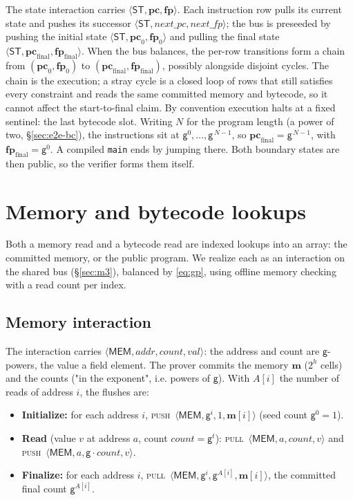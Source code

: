 \documentclass[11pt]{article}
\newcommand{\gen}{\mathsf{g}}
\newcommand{\pc}{\mathbf{pc}}
\newcommand{\fp}{\mathbf{fp}}
\newcommand{\mem}{\mathbf{m}}
\newcommand{\addr}{\mathit{addr}}
\newcommand{\val}{\mathit{val}}
\newcommand{\cnt}{\mathit{count}}
\newcommand{\push}{\textsc{push}}
\newcommand{\pull}{\textsc{pull}}
\newcommand{\tup}[1]{\langle #1 \rangle}
\newcommand{\dsep}[1]{\mathsf{#1}}
\begin{document}
The state interaction carries $\tup{\dsep{ST},\pc,\fp}$. Each instruction row pulls its current state and pushes its successor $\tup{\dsep{ST},\mathit{next\_pc},\mathit{next\_fp}}$; the bus is preseeded by pushing the initial state $\tup{\dsep{ST},\pc_0,\fp_0}$ and pulling the final state $\tup{\dsep{ST},\pc_{\mathrm{final}},\fp_{\mathrm{final}}}$. When the bus balances, the per-row transitions form a chain from $(\pc_0,\fp_0)$ to $(\pc_{\mathrm{final}},\fp_{\mathrm{final}})$, possibly alongside disjoint cycles. The chain is the execution; a stray cycle is a closed loop of rows that still satisfies every constraint and reads the same committed memory and bytecode, so it cannot affect the start-to-final claim. By convention execution halts at a fixed sentinel: the last bytecode slot. Writing $N$ for the program length (a power of two, \S\ref{sec:e2e-bc}), the instructions sit at $\gen^{0},\dots,\gen^{\,N-1}$, so $\pc_{\mathrm{final}}=\gen^{\,N-1}$, with $\fp_{\mathrm{final}}=\gen^{0}$. A compiled \texttt{main} ends by jumping there. Both boundary states are then public, so the verifier forms them itself.

\section{Memory and bytecode lookups}\label{sec:omc}

Both a memory read and a bytecode read are indexed lookups into an array: the committed memory, or the public program. We realize each as an interaction on the shared bus (\S\ref{sec:m3}), balanced by \eqref{eq:gp}, using offline memory checking with a read count per index.

\subsection{Memory interaction}\label{sec:memchan}

The interaction carries $\tup{\dsep{MEM},\addr,\cnt,\val}$: the address and count are $\gen$-powers, the value a field element. The prover commits the memory $\mem$ ($2^{h}$ cells) and the counts ("in the exponent", i.e. powers of $\gen$). With $A[i]$ the number of reads of address $i$, the flushes are:
\begin{itemize}
\item \textbf{Initialize:} for each address $i$, \push\ $\tup{\dsep{MEM},\gen^{i},1,\mem[i]}$ (seed count $\gen^{0}=1$).
\item \textbf{Read} (value $v$ at address $a$, count $\cnt=\gen^{t}$): \pull\ $\tup{\dsep{MEM},a,\cnt,v}$ and \push\ $\tup{\dsep{MEM},a,\gen\cdot\cnt,v}$.
\item \textbf{Finalize:} for each address $i$, \pull\ $\tup{\dsep{MEM},\gen^{i},\gen^{A[i]},\mem[i]}$, the committed final count $\gen^{A[i]}$.
\end{itemize}
\end{document}
